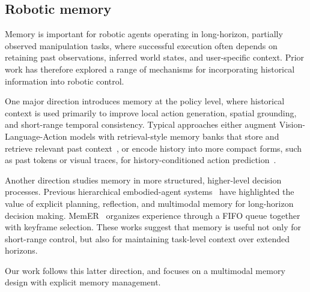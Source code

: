 \subsection{Robotic memory}
Memory is important for robotic agents operating in long-horizon, partially observed manipulation tasks, where successful execution often depends on retaining past observations, inferred world states, and user-specific context. Prior work has therefore explored a range of mechanisms for incorporating historical information into robotic control.

One major direction introduces memory at the policy level, where historical context is used primarily to improve local action generation, spatial grounding, and short-range temporal consistency. Typical approaches either augment Vision-Language-Action models with retrieval-style memory banks that store and retrieve relevant past context~\cite{Li2025MAPVLAMP, Fang2025SAM2ActIV, Zhu2020VisionDialogNB, Shi2025MemoryVLAPM}, or encode history into more compact forms, such as past tokens or visual traces, for history-conditioned action prediction~\cite{Torne2025LearningLD, Zheng2024TraceVLAVT}. 

Another direction studies memory in more structured, higher-level decision processes. Previous hierarchical embodied-agent systems~\cite{Wang2023JARVIS1OM, Li2024Optimus1HM, Wang2023DescribeEP} have highlighted the value of explicit planning, reflection, and multimodal memory for long-horizon decision making. MemER~\cite{Sridhar2025MemERSU} organizes experience through a FIFO queue together with keyframe selection. These works suggest that memory is useful not only for short-range control, but also for maintaining task-level context over extended horizons.

Our work follows this latter direction, and focuses on a multimodal memory design with explicit memory management.